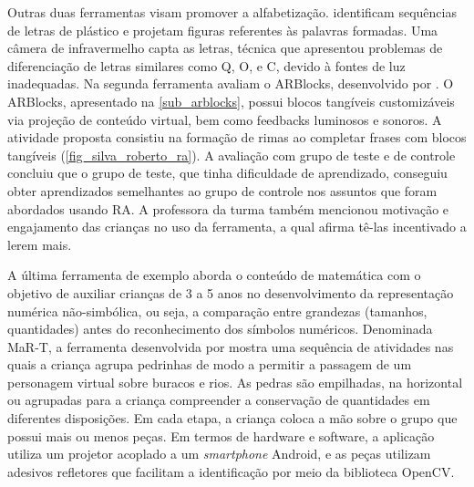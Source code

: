 Outras duas ferramentas visam promover a alfabetização.  identificam sequências de letras de plástico e projetam figuras referentes às palavras formadas. Uma câmera de infravermelho capta as letras, técnica que apresentou problemas de diferenciação de letras similares como Q, O, e C, devido à fontes de luz inadequadas. Na segunda ferramenta  avaliam o ARBlocks, desenvolvido por . O ARBlocks, apresentado na \autoref{sub_arblocks}, possui blocos tangíveis customizáveis via projeção de conteúdo virtual, bem como feedbacks luminosos e sonoros. A atividade proposta consistiu na formação de rimas ao completar frases com blocos tangíveis (\autoref{fig_silva_roberto_ra}). A avaliação com grupo de teste e de controle concluiu que o grupo de teste, que tinha dificuldade de aprendizado, conseguiu obter aprendizados semelhantes ao grupo de controle nos assuntos que foram abordados usando RA. A professora da turma também mencionou motivação e engajamento das crianças no uso da ferramenta, a qual afirma tê-las incentivado a lerem mais.

A última ferramenta de exemplo aborda o conteúdo de matemática com o objetivo de auxiliar crianças de 3 a 5 anos no desenvolvimento da representação numérica não-simbólica, ou seja, a comparação entre grandezas (tamanhos, quantidades) antes do reconhecimento dos símbolos numéricos. Denominada MaR-T, a ferramenta desenvolvida por  mostra uma sequência de atividades nas quais a criança agrupa pedrinhas de modo a permitir a passagem de um personagem virtual sobre buracos e rios. As pedras são empilhadas, na horizontal ou agrupadas para a criança compreender a conservação de quantidades em diferentes disposições. Em cada etapa, a criança coloca a mão sobre o grupo que possui mais ou menos peças. Em termos de hardware e software, a aplicação utiliza um projetor acoplado a um \textit{smartphone} Android, e as peças utilizam adesivos refletores que facilitam a identificação por meio da biblioteca OpenCV.


